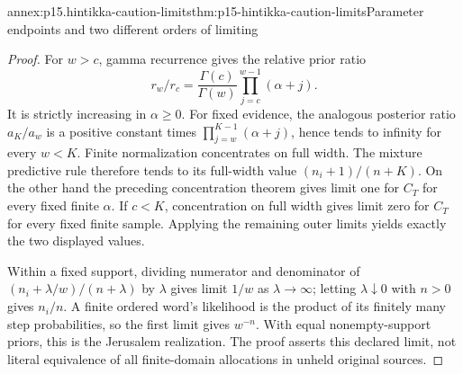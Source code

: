 \begin{annexitem}{annex:p15.hintikka-caution-limits}{thm:p15-hintikka-caution-limits}{Parameter endpoints and two different orders of limiting}
\begin{proof}
For \(w>c\), gamma recurrence gives the relative prior ratio
\[
 r_w/r_c=\frac{\Gamma(c)}{\Gamma(w)}
                \prod_{j=c}^{w-1}(\alpha+j).
\]
It is strictly increasing in \(\alpha\geq0\). For fixed evidence,
the analogous posterior ratio \(a_K/a_w\) is a positive constant
times \(\prod_{j=w}^{K-1}(\alpha+j)\), hence tends to infinity
for every \(w<K\). Finite normalization concentrates on full width.
The mixture predictive rule therefore tends to its full-width value
\((n_i+1)/(n+K)\). On the other hand the preceding concentration
theorem gives limit one for \(C_T\) for every fixed finite
\(\alpha\). If \(c<K\), concentration on full width gives
limit zero for \(C_T\) for every fixed finite sample. Applying
the remaining outer limits yields exactly the two displayed values.

Within a fixed support, dividing numerator and denominator of
\((n_i+\lambda/w)/(n+\lambda)\) by \(\lambda\) gives limit
\(1/w\) as \(\lambda\to\infty\); letting \(\lambda\downarrow0\)
with \(n>0\) gives \(n_i/n\). A finite ordered word's likelihood
is the product of its finitely many step probabilities, so the first
limit gives \(w^{-n}\). With equal nonempty-support priors, this
is the Jerusalem realization. The proof asserts this declared limit,
not literal equivalence of all finite-domain allocations in unheld
original sources.
\end{proof}
\end{annexitem}

